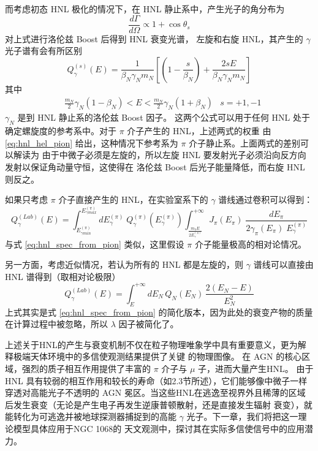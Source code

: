 \documentclass[printMode=false, declarePage=false]{ecnuthesis}
\begin{document}
而考虑初态 HNL 极化的情况下，在 HNL 静止系中，产生光子的角分布为
\begin{equation}
  \frac{d \Gamma}{d \Omega} \propto 1 + \cos{\theta_{s}} \label{eq:HNL_gamma_spec_d}
\end{equation}
对上式进行洛伦兹 Boost 后得到 HNL 衰变光谱，
左旋和右旋 HNL，其产生的 $\gamma$ 光子谱有会有所区别
\begin{equation}
  Q_\gamma^{(s)} (E) = \frac{1}{\beta_N \gamma_N m_N} \left[ \left( 1 - \frac{s}{\beta_N}\right) + \frac{2 s E}{\beta_N \gamma_N m_N} \right]
\end{equation}
其中 
\begin{align*}
   & \frac{m_N}{2} \gamma_N (1 - \beta_N) < E < \frac{m_N}{2} \gamma_N (1 + \beta_N)
   & s = +1,-1
\end{align*}
$\gamma_N$ 是到 HNL 静止系的洛伦兹 Boost 因子。
这两个公式可以用于任何 HNL 处于确定螺旋度的参考系中。对于 $\pi$ 介子产生的 HNL，上述两式的权重
由 \ref{eq:hnl_hel_pion} 给出，这种情况下参考系为 $\pi$ 介子静止系。上面两式的差别可以解读为
由于中微子必须是左旋的，所以左旋 HNL 要发射光子必须沿向反方向发射以保证角动量守恒，这使得在
洛伦兹 Boost 后光子能量降低，而右旋 HNL 则反之。

如果只考虑 $\pi$ 介子直接产生的 HNL，在实验室系下的 $\gamma$ 谱线通过卷积可以得到：
\begin{equation}
  Q_{\gamma}^{(Lab)} (E) = \int_{E_{\gamma min}^{(\pi)}}^{E_{\gamma max}^{(\pi)}} d E_\gamma^{(\pi)} \; Q_\gamma^{(\pi)}(E_\gamma^{(\pi)}) \int_{\frac{m_\pi E}{2 E_\gamma^{(\pi)}}}
  ^{+\infty} J_\pi (E_\pi) \; \frac{d E_\pi}{2 \gamma_\pi(E_\pi) \; E_\gamma^{(\pi)}}
\end{equation}
与式 \ref{eq:hnl_spec_from_pion} 类似，这里假设 $\pi$ 介子能量极高的相对论情况。

另一方面，考虑近似情况，若认为所有的 HNL 都是左旋的，则 $\gamma$ 谱线可以直接由 HNL 谱得到（取相对论极限）
\begin{equation}
  Q_\gamma^{(Lab)} (E) = \int_{E}^{+\infty}d E_N \, Q_N(E_N) \, \frac{2 (E_N - E)}{E_N^2} \label{eq:pure_L_N_gamma}
\end{equation}
上式其实是式 \ref{eq:hnl_spec_from_pion} 的简化版本，因为此处的衰变产物的质量在计算过程中被忽略，所以 $\lambda$ 因子被简化了。

上述关于HNL的产生与衰变机制不仅在粒子物理唯象学中具有重要意义，更为解释极端天体环境中的多信使观测结果提供了关键
的物理图像。
在 AGN 的核心区域，强烈的质子相互作用提供了丰富的 $\pi$ 介子与 $\mu$ 子，进而大量产生HNL。
由于 HNL 具有较弱的相互作用和较长的寿命（如2.3节所述），它们能够像中微子一样穿透对高能光子不透明的 AGN
冕区。当这些HNL在逃逸至视界外且稀薄的区域后发生衰变（无论是产生电子再发生逆康普顿散射，还是直接发生辐射
衰变），就能转化为可逃逸并被地球探测器捕捉到的高能 $\gamma$ 光子。下一章，我们将把这一理论模型具体应用于NGC 1068的
天文观测中，探讨其在实际多信使信号中的应用潜力。
\end{document}
